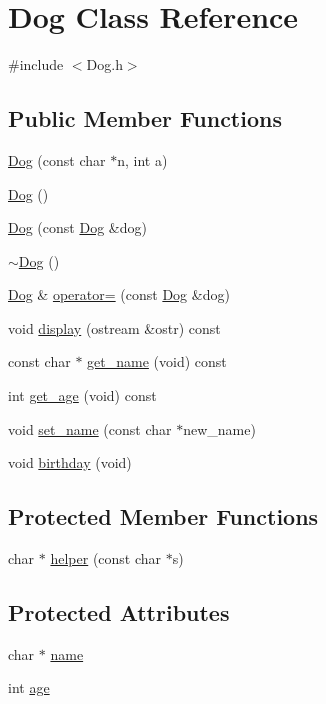\hypertarget{classDog}{}\section{Dog Class Reference}
\label{classDog}


{\ttfamily \#include $<$Dog.\+h$>$}

\subsection*{Public Member Functions}
\begin{DoxyCompactItemize}
\item 
\hyperlink{classDog_a849ca73c5b2e87a758e5544872d33abd}{Dog} (const char $\ast$n, int a)
\item 
\hyperlink{classDog_a16e01978bb90b2989ee3da3e87071b1b}{Dog} ()
\item 
\hyperlink{classDog_a52127b82e04a96c5966052f5b38bdfdb}{Dog} (const \hyperlink{classDog}{Dog} \&dog)
\item 
\hyperlink{classDog_aeacf410641eab28eabea6bc5269eb4ef}{$\sim$\+Dog} ()
\item 
\hyperlink{classDog}{Dog} \& \hyperlink{classDog_a333528bafc1505d2f4a5e68b9f4195db}{operator=} (const \hyperlink{classDog}{Dog} \&dog)
\item 
void \hyperlink{classDog_af9034303a41074e132f093e5d75c6074}{display} (ostream \&ostr) const 
\item 
const char $\ast$ \hyperlink{classDog_a4c645a2892c0f2d0fbbd5d580c3586ea}{get\+\_\+name} (void) const 
\item 
int \hyperlink{classDog_a36666d8ce622714d77853556edb6c3c1}{get\+\_\+age} (void) const 
\item 
void \hyperlink{classDog_a1565c21895d74e5f3ab1e024ef27f6a7}{set\+\_\+name} (const char $\ast$new\+\_\+name)
\item 
void \hyperlink{classDog_adbf57a09358f044cbb95df7af6d5816b}{birthday} (void)
\end{DoxyCompactItemize}
\subsection*{Protected Member Functions}
\begin{DoxyCompactItemize}
\item 
char $\ast$ \hyperlink{classDog_ae88239590f01f57d6b01d338a0e48378}{helper} (const char $\ast$s)
\end{DoxyCompactItemize}
\subsection*{Protected Attributes}
\begin{DoxyCompactItemize}
\item 
char $\ast$ \hyperlink{classDog_a9f014dbeb42821cdb23f08eefa161c0a}{name}
\item 
int \hyperlink{classDog_a06f3f35c8fe0c80824156dcf9562b1cd}{age}
\end{DoxyCompactItemize}


